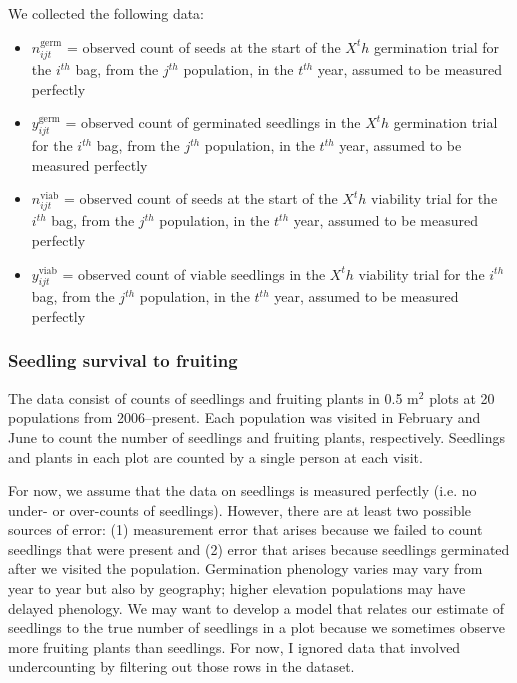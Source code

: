 \documentclass[12pt, oneside, titlepage]{article}   	%
\begin{document}
We collected the following data: 

\begin{itemize}
	\item $n^{\mathrm{germ}}_{ijt}$ = observed count of seeds at the start of the $X^th$ germination trial for the $i^{th}$ bag, from the $j^{th}$ population, in the $t^{th}$ year, assumed to be measured perfectly
	\item $y^{\mathrm{germ}}_{ijt}$ = observed count of germinated seedlings in the $X^th$ germination trial for the $i^{th}$ bag, from the $j^{th}$ population, in the $t^{th}$ year, assumed to be measured perfectly 
	\item $n^{\mathrm{viab}}_{ijt}$ = observed count of seeds at the start of the $X^th$ viability trial for the $i^{th}$ bag, from the $j^{th}$ population, in the $t^{th}$ year, assumed to be measured perfectly 
	\item $y^{\mathrm{viab}}_{ijt}$ = observed count of viable seedlings in the $X^th$ viability trial for the $i^{th}$ bag, from the $j^{th}$ population, in the $t^{th}$ year, assumed to be measured perfectly 
\end{itemize}

\subsubsection*{Seedling survival to fruiting}

The data consist of counts of seedlings and fruiting plants in 0.5 m$^2$ plots at 20 populations from 2006--present. Each population was visited in February and June to count the number of seedlings and fruiting plants, respectively. Seedlings and plants in each plot are counted by a single person at each visit. 

For now, we assume that the data on seedlings is measured perfectly (i.e. no under- or over-counts of seedlings). However, there are at least two possible sources of error: (1) measurement error that arises because we failed to count seedlings that were present and (2) error that arises because seedlings germinated after we visited the population. Germination phenology varies may vary from year to year but also by geography; higher elevation populations may have delayed phenology. We may want to develop a model that relates our estimate of seedlings to the true number of seedlings in a plot because we sometimes observe more fruiting plants than seedlings. For now, I ignored data that involved undercounting by filtering out those rows in the dataset.
\end{document}
